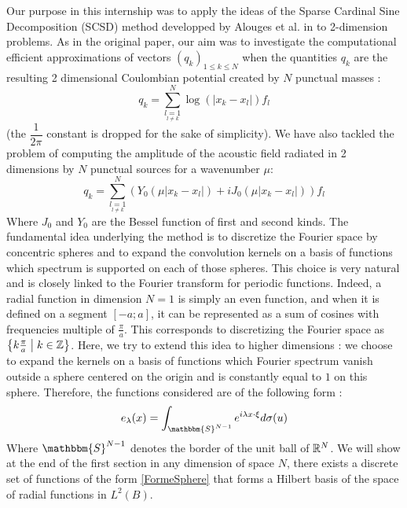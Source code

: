 \documentclass[11pt,a4paper]{article}
\begin{document}
Our purpose in this internship was to apply the ideas of the Sparse Cardinal Sine Decomposition (SCSD) method developped by Alouges et al. in \cite{Alouges2015} to 2-dimension problems. As in the original paper, our aim was to investigate the computational efficient approximations of vectors $(q_k)_{1\leq k \leq N}$ when the quantities $q_k$ are the resulting 2 dimensional Coulombian potential created by $N$ punctual masses :
\begin{equation}
 q_k = \sum_{\underset{l\neq k}{l=1}}^N \log(|x_k - x_l|)f_l 
\label{LaSommeACalculerDansLArticle}
\end{equation}
(the $\dfrac{1}{2\pi}$ constant is dropped for the sake of simplicity). 
We have also tackled the problem of computing the amplitude of the acoustic field radiated in 2 dimensions by $N$ punctual sources for a wavenumber $\mu$: 
\begin{equation}
 q_k = \sum_{\underset{l\neq k}{l=1}}^N \left(Y_0(\mu|x_k - x_l|) + iJ_0(\mu|x_k - x_l|)\right)f_l 
\label{LaDeuxiemeSommeACalculerDansLArticle}
\end{equation}
Where $J_0$ and $Y_0$ are the Bessel function of first and second kinds. The fundamental idea underlying the method is to discretize the Fourier space by concentric spheres and to expand the convolution kernels on a basis of functions which spectrum is supported on each of those spheres. This choice is very natural and is closely linked to the Fourier transform for periodic functions. Indeed, a radial function in dimension $N=1$ is simply an even function, and when it is defined on a segment $[-a;a]$, it can be represented as a sum of cosines with frequencies multiple of $\frac{\pi}{a}$. This corresponds to discretizing the Fourier space as $\left\{k\frac{\pi}{a}\mathrel{}\middle|\mathrel{}k \in \mathbb{Z}\right\}$. Here, we try to extend this idea to higher dimensions : we choose to expand the kernels on a basis of functions which Fourier spectrum vanish outside a sphere centered on the origin and is constantly equal to $1$ on this sphere. Therefore, the functions considered are of the following form : 
\begin{equation}
e_\lambda(x) = \int_{\mathbbm{S}^{N-1}} e^{i\lambda x \cdot  \xi} d\sigma(u)
\label{FormeSphere}
\end{equation}
Where $\mathbbm{S}^{N-1}$ denotes the border of the unit ball of $\mathbb{R}^N$. 
We will show at the end of the first section in any dimension of space $N$, there exists a discrete set of functions of the form \ref{FormeSphere} that forms a Hilbert basis of the space of radial functions in $L^2(B)$. 
\end{document}
